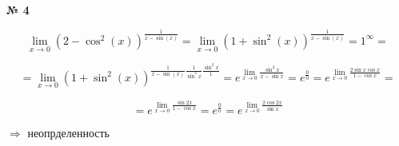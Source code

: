 \documentclass{article}
\begin{document}
\textbf{№ 4} 

\begingroup
\Large

$$ \lim_{x\to 0} \left(2-\cos^2(x)\right)^{\frac{1}{x-\sin(x)}}
= \lim_{x\to 0} \left(1+\sin^2(x)\right)^{\frac{1}{x-\sin(x)}}
= 1^{\infty} 
= $$

$$ = \lim_{x\to 0} \left(1+\sin^2(x)\right)^{\frac{1}{x-\sin(x)}\frac{1}{\sin^2x}\frac{\sin^2x}{1}}
= e^{\lim\limits_{x \to 0}\frac{\sin^2x}{x-\sin{x}}} 
= e^{\frac{0}{0}}
= e^{\lim\limits_{x \to 0}\frac{2\sin{x}\cos{x}}{1-\cos{x}}} 
= $$

$$ = e^{\lim\limits_{x \to 0}\frac{\sin{2x}}{1-\cos{x}}}
= e^{\frac{0}{0}}
= e^{\lim\limits_{x \to 0}\frac{2\cos{2x}}{\sin{x}}} $$

$\Rightarrow$ неопрделенность

\endgroup
\end{document}
